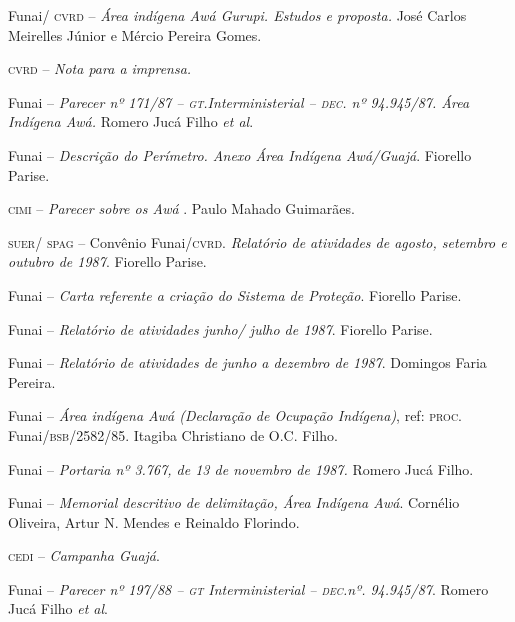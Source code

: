 \begin{itemize}
{\item[1985] Funai/ \textsc{cvrd} -- \emph{Área indígena Awá Gurupi. Estudos e
proposta.} José Carlos Meirelles Júnior e Mércio Pereira Gomes.

\item[1985] \textsc{cvrd} -- \emph{Nota para a imprensa.}

\item[1987] Funai -- \emph{Parecer nº 171/87 -- \textsc{gt}.Interministerial
-- \textsc{dec}. nº 94.945/87. Área Indígena Awá.} Romero Jucá Filho \emph{et
al}.

\item[1987] Funai -- \emph{Descrição do Perímetro. Anexo Área Indígena
Awá/Guajá}. Fiorello Parise.

\item[1987] \textsc{cimi} -- \emph{Parecer sobre os Awá} . Paulo Mahado
Guimarães.

\item[1987] \textsc{suer}/ \textsc{spag} -- Convênio Funai/\textsc{cvrd}. \emph{Relatório de
atividades de agosto, setembro e outubro de 1987}. Fiorello Parise.

\item[1987] Funai -- \emph{Carta referente a criação do Sistema de
Proteção}. Fiorello Parise.

\item[1987] Funai -- \emph{Relatório de atividades junho/ julho de
1987}. Fiorello Parise.

\item[1987] Funai -- \emph{Relatório de atividades de junho a dezembro
de 1987}. Domingos Faria Pereira.

\item[1987] Funai -- \emph{Área indígena Awá (Declaração de Ocupação
Indígena)}, ref: \textsc{proc}. Funai/\textsc{bsb}/2582/85. Itagiba Christiano de O.C.
Filho.

\item[1987] Funai -- \emph{Portaria nº 3.767, de 13 de novembro de 1987.} Romero Jucá Filho.

\item[1987] Funai -- \emph{Memorial descritivo de delimitação, Área
Indígena Awá}. Cornélio Oliveira, Artur N. Mendes e Reinaldo Florindo.

\item[1987] \textsc{cedi} -- \emph{Campanha Guajá}.

\item[1988] Funai -- \emph{Parecer nº 197/88 -- \textsc{gt} Interministerial
-- \textsc{dec}.nº. 94.945/87}. Romero Jucá Filho \emph{et al}.

}
\end{itemize}
